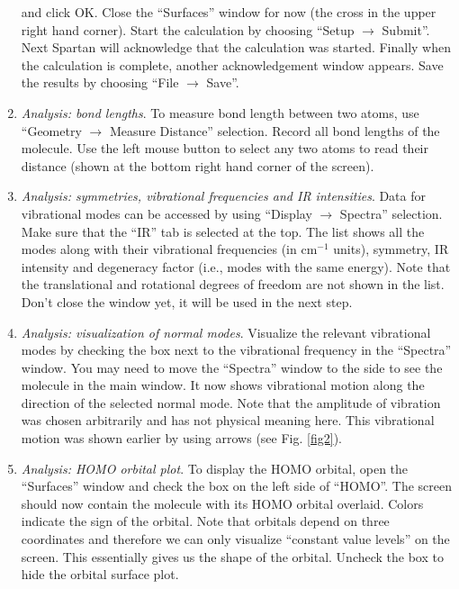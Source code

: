 \documentclass[byrevtex,amssymb,aps,pra,floatfix,letterpaper]{revtex4}
\begin{document}
\begin{enumerate}
and click OK. Close the ``Surfaces'' window for now (the cross in the upper right hand corner). Start the calculation by choosing ``Setup $\to$ Submit''. Next Spartan will acknowledge that the calculation was started. Finally when the calculation is complete, another acknowledgement window appears. Save the results by choosing ``File $\to$ Save''.

\item \textit{Analysis: bond lengths}. To measure bond length between two atoms, use ``Geometry $\to$ Measure Distance'' selection. Record all bond lengths of the molecule. Use the left mouse button to select any two atoms to read their distance (shown at the bottom right hand corner of the screen).

\item \textit{Analysis: symmetries, vibrational frequencies and IR intensities}. Data for vibrational modes can be accessed by using ``Display $\to$ Spectra'' selection. Make sure that the ``IR'' tab is selected at the top. The list shows all the modes along with their vibrational frequencies (in cm$^{-1}$ units), symmetry, IR intensity and degeneracy factor (i.e., modes with the same energy). Note that the translational and rotational degrees of freedom are not shown in the list. Don't close the window yet, it will be used in the next step.

\item \textit{Analysis: visualization of normal modes}. Visualize the relevant vibrational modes by checking the box next to the vibrational frequency in the ``Spectra'' window. You may need to move the ``Spectra'' window to the side to see the molecule in the main window. It now shows vibrational motion along the direction of the selected normal mode. Note that the amplitude of vibration was chosen arbitrarily and has not physical meaning here. This vibrational motion was shown earlier by using arrows (see Fig. \ref{fig2}).

\item \textit{Analysis: HOMO orbital plot}. To display the HOMO orbital, open the ``Surfaces'' window and check the box on the left side of ``HOMO''. The screen should now contain the molecule with its HOMO orbital overlaid. Colors indicate the sign of the orbital. Note that orbitals depend on three coordinates and therefore we can only visualize ``constant value levels'' on the screen. This essentially gives us the shape of the orbital. Uncheck the box to hide the orbital surface plot.

\end{enumerate}
\end{document}
